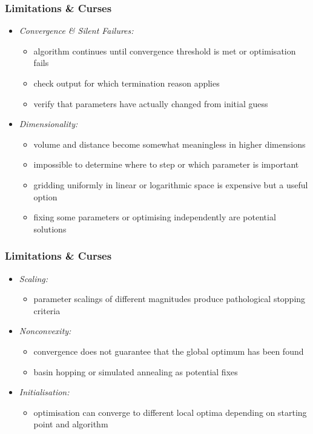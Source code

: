 	\begin{frame}
		\frametitle{Limitations \& Curses}
		\begin{itemize}
			\item<2-> \itshape{Convergence \& Silent Failures:}
			\begin{itemize}
				\item<3-> algorithm continues until convergence threshold is met or optimisation fails
				\item<4-> check output for which termination reason applies
				\item<5-> verify that parameters have actually changed from initial guess
			\end{itemize}
			\item<6-> \itshape{Dimensionality:}
			\begin{itemize}
				\item<7-> volume and distance become somewhat meaningless in higher dimensions
				\item<8-> impossible to determine where to step or which parameter is important
				\item<9-> gridding uniformly in linear or logarithmic space is expensive but a useful option
				\item<10-> fixing some parameters or optimising independently are potential solutions
			\end{itemize}
		\end{itemize}
	\end{frame}

	\begin{frame}[noframenumbering]
		\frametitle{Limitations \& Curses}
		\begin{itemize}
			\item<2-> \itshape{Scaling:}
			\begin{itemize}
				\item<3-> parameter scalings of different magnitudes produce pathological stopping criteria
			\end{itemize}
			\item<4-> \itshape{Nonconvexity:}
			\begin{itemize}
				\item<5-> convergence does not guarantee that the global optimum has been found
				\item<6-> basin hopping or simulated annealing as potential fixes
			\end{itemize}
			\item<7-> \itshape{Initialisation:}
			\begin{itemize}
				\item<8-> optimisation can converge to different local optima depending on starting point and algorithm
			\end{itemize}
		\end{itemize}
	\end{frame}

